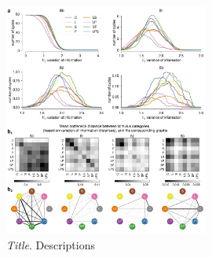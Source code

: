 \begin{figure}[H]
    \centering
    \includegraphics[width=0.6\textwidth,center]{../figures/report/Fig5.png}
    \caption{\label{fig:5}
    \textit{Title}.
    Descriptions
    }
\end{figure}